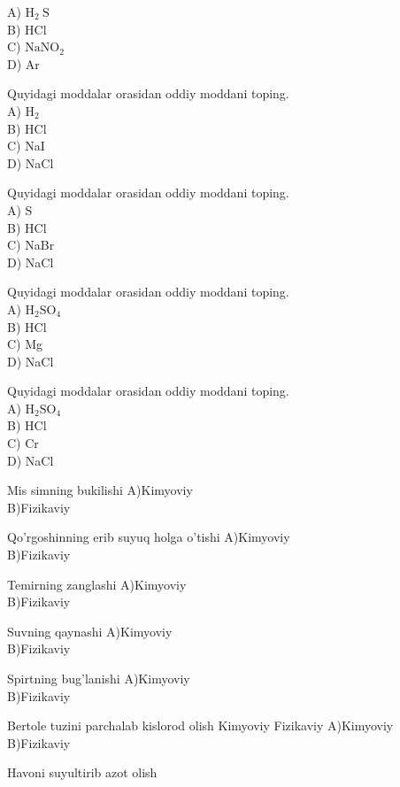 A) $\mathrm{H}_{2} \mathrm{~S}$\\
B) HCl\\
C) $\mathrm{NaNO}_{2}$\\
D) Ar
  \item Quyidagi moddalar orasidan oddiy moddani toping.\\
A) $\mathrm{H}_{2}$\\
B) HCl\\
C) NaI\\
D) NaCl
  \item Quyidagi moddalar orasidan oddiy moddani toping.\\
A) S\\
B) HCl\\
C) NaBr\\
D) NaCl
  \item Quyidagi moddalar orasidan oddiy moddani toping.\\
A) $\mathrm{H}_{2} \mathrm{SO}_{4}$\\
B) HCl\\
C) Mg\\
D) NaCl
  \item Quyidagi moddalar orasidan oddiy moddani toping.\\
A) $\mathrm{H}_{2} \mathrm{SO}_{4}$\\
B) HCl\\
C) Cr\\
D) NaCl
  \item Mis simning bukilishi
A)Kimyoviy\\
B)Fizikaviy\\
  \item Qo'rgoshinning erib suyuq holga o'tishi
A)Kimyoviy\\
B)Fizikaviy\\
  \item Temirning zanglashi
A)Kimyoviy\\
B)Fizikaviy\\
  \item Suvning qaynashi
A)Kimyoviy\\
B)Fizikaviy\\
  \item Spirtning bug'lanishi
A)Kimyoviy\\
B)Fizikaviy\\
  \item Bertole tuzini parchalab kislorod olish Kimyoviy Fizikaviy
A)Kimyoviy\\
B)Fizikaviy\\
  \item Havoni suyultirib azot olish
